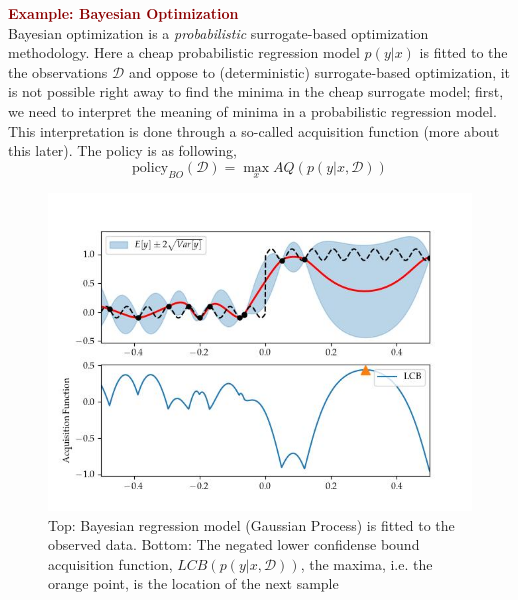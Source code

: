 \begin{tcolorbox}[
    sharp corners,
    boxrule=0mm,
    enhanced,
    borderline west={4pt}{-2pt}{darkred},
    borderline north={1pt}{0pt}{darkred},
    borderline south={1pt}{0pt}{darkred},
    borderline east={1pt}{0pt}{darkred},
    colframe=darkred!10,
    coltitle=darkred,
]
{ \textcolor{darkred}{\textbf{Example: Bayesian Optimization}}}\\
    Bayesian optimization is a \textit{probabilistic} surrogate-based optimization
    methodology. Here a cheap probabilistic regression model $p(y|x)$ is fitted to the
    the observations $\mathcal{D}$ and oppose to (deterministic) surrogate-based
    optimization, it is not possible right away to find the minima in the cheap
    surrogate model; first, we need to interpret the meaning of minima in a probabilistic
    regression model. This interpretation is done through a so-called acquisition
    function (more about this later). The policy is as following,
    $$\text{policy}_{BO}(\mathcal{D}) = \max_x AQ(p(y|x,\mathcal{D}))$$

    \begin{figure}[H]
        \begin{minipage}[c]{0.67\textwidth}
          \includegraphics[width=\textwidth]{Pictures/SimonsTestGaussian Process - sklearn002.jpg}
        \end{minipage}\hfill
        \begin{minipage}[c]{0.3\textwidth}
          \caption{Top: Bayesian regression model (Gaussian Process) is fitted to the
          observed data. Bottom: The negated lower confidense bound acquisition function,
          $LCB(p(y|x,\mathcal{D}))$, the maxima, i.e. the orange point, is the location of the
          next sample} \label{fig:03-03}
        \end{minipage}
    \end{figure}
   

\end{tcolorbox}
